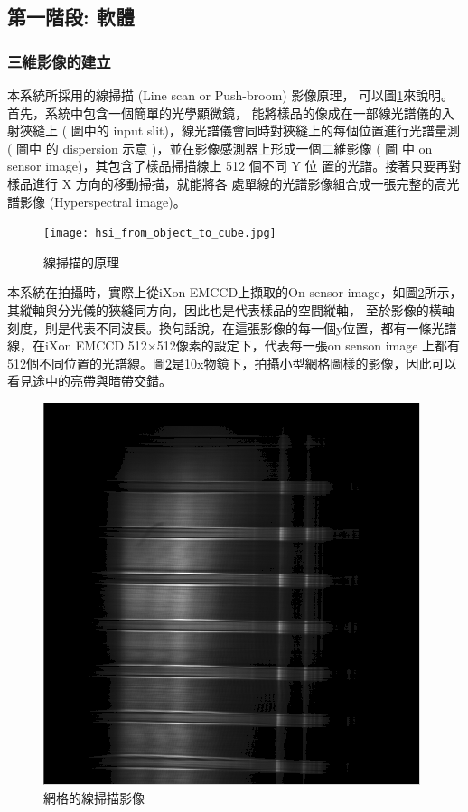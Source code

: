 \documentclass[12pt]{article}
\begin{document}
    \subsection{第一階段: 軟體}
    \subsubsection{三維影像的建立}
    本系統所採用的線掃描 (Line scan or Push-broom) 影像原理，
    可以圖\ref{figure: lineScan}來說明。首先，系統中包含一個簡單的光學顯微鏡，
    能將樣品的像成在一部線光譜儀的入射狹縫上 ( 圖中的 input 
    slit)，線光譜儀會同時對狹縫上的每個位置進行光譜量測 ( 圖中
    的 dispersion 示意 )，並在影像感測器上形成一個二維影像 ( 圖
    中 on sensor image)，其包含了樣品掃描線上 512 個不同 Y 位
    置的光譜。接著只要再對樣品進行 X 方向的移動掃描，就能將各
    處單線的光譜影像組合成一張完整的高光譜影像 (Hyperspectral 
    image)。

    \begin{figure}[t]
        \centering
        \texttt{[image: hsi\_from\_object\_to\_cube.jpg]}
        \caption{線掃描的原理}
        \label{figure: lineScan}
    \end{figure}

    本系統在拍攝時，實際上從iXon EMCCD上擷取的On sensor image，如圖\ref{figure: linespectrum}所示，其縱軸與分光儀的狹縫同方向，因此也是代表樣品的空間縱軸，
    至於影像的橫軸刻度，則是代表不同波長。換句話說，在這張影像的每一個y位置，都有一條光譜線，在iXon EMCCD 512$\times$512像素的設定下，代表每一張on senson image
    上都有512個不同位置的光譜線。圖\ref{figure: linespectrum}是10x物鏡下，拍攝小型網格圖樣的影像，因此可以看見途中的亮帶與暗帶交錯。

    \begin{figure}[t]
        \centering
        \includegraphics[width=0.5\linewidth]{lineSpectrum1213LDLS.png}
        \caption{網格的線掃描影像}
        \label{figure: linespectrum}
    \end{figure}
\end{document}
